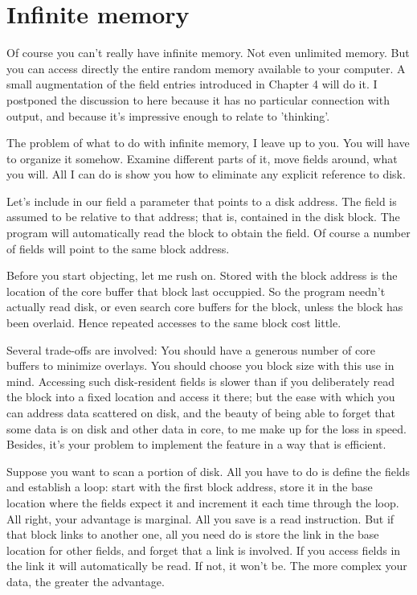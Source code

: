 \documentclass[b5paper, oneside]{book}
\begin{document}
\section{Infinite memory}
Of course you can't really have infinite memory. Not even unlimited memory. But you can access directly the entire random memory available to your computer. A small augmentation of the field entries introduced in Chapter 4 will do it. I postponed the discussion to here because it has no particular connection with output, and because it's impressive enough to relate to 'thinking'.

The problem of what to do with infinite memory, I leave up to you. You will have to organize it somehow. Examine different parts of it, move fields around, what you will. All I can do is show you how to eliminate any explicit reference to disk.

Let's include in our field a parameter that points to a disk address. The field is assumed to be relative to that address; that is, contained in the disk block. The program will automatically read the block to obtain the field. Of course a number of fields will point to the same block address.

Before you start objecting, let me rush on. Stored with the block address is the location of the core buffer that block last occuppied. So the program needn't actually read disk, or even search core buffers for the block, unless the block has been overlaid. Hence repeated accesses to the same block cost little.

Several trade-offs are involved: You should have a generous number of core buffers to minimize overlays. You should choose you block size with this use in mind. Accessing such disk-resident fields is slower than if you deliberately read the block into a fixed location and access it there; but the ease with which you can address data scattered on disk, and the beauty of being able to forget that some data is on disk and other data in core, to me make up for the loss in speed. Besides, it's your problem to implement the feature in a way that is efficient.

Suppose you want to scan a portion of disk. All you have to do is define the fields and establish a loop: start with the first block address, store it in the base location where the fields expect it and increment it each time through the loop. All right, your advantage is marginal. All you save is a read instruction. But if that block links to another one, all you need do is store the link in the base location for other fields, and forget that a link is involved. If you access fields in the link it will automatically be read. If not, it won't be. The more complex your data, the greater the advantage.
\end{document}
